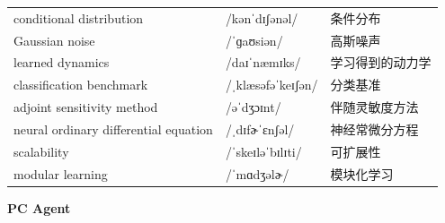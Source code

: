 \documentclass[UTF8,12pt,a4paper]{ctexart}
\providecommand{\zh}[1]{#1}
\begin{document}
\begin{tabular*}{\textwidth}{@{\extracolsep{\fill}}lll@{}}
conditional distribution & {\ipafont /kənˈdɪʃənəl/} & \zh{条件分布} \\
Gaussian noise & {\ipafont /ˈɡaʊsiən/} & \zh{高斯噪声} \\
learned dynamics & {\ipafont /daɪˈnæmɪks/} & \zh{学习得到的动力学} \\
classification benchmark & {\ipafont /ˌklæsəfəˈkeɪʃən/} & \zh{分类基准} \\
adjoint sensitivity method & {\ipafont /əˈdʒɔɪnt/} & \zh{伴随灵敏度方法} \\
neural ordinary differential equation & {\ipafont /ˌdɪfɚˈɛnʃəl/} & \zh{神经常微分方程} \\
scalability & {\ipafont /ˈskeɪləˈbɪlɪti/} & \zh{可扩展性} \\
modular learning & {\ipafont /ˈmɑdʒəlɚ/} & \zh{模块化学习} \\
\bottomrule
\end{tabular*}

\newpage

\begin{center}
    {\Large\bfseries PC Agent}
\end{center}
\end{document}
